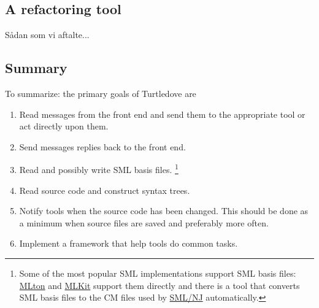 \documentclass[a4paper,oneside]{article}
\begin{document}
%
%

\subsection{A refactoring tool}
\label{primary_goals:a_refactoring_tool}
Sådan som vi aftalte...

\subsection{Summary}
To summarize: the primary goals of Turtledove are
\begin{enumerate}
\item Read messages from the front end and send them to the appropriate tool or
      act directly upon them.
  
\item Send messages replies back to the front end.

\item Read and possibly write SML basis files.
\footnote{Some of the most popular SML implementations support SML basis files:
\href{http://mlton.org/}{MLton} and \href{http://www.itu.dk/research/mlkit}{MLKit} support them
directly and there is a tool that converts SML basis files to the CM files used by
\href{http://smlnj.org}{SML/NJ} automatically.}

\item Read source code and construct syntax trees.

\item Notify tools when the source code has been changed. This should be done as a minimum when
      source files are saved and preferably more often.

\item Implement a framework that help tools do common tasks.
\end{enumerate}
\end{document}
